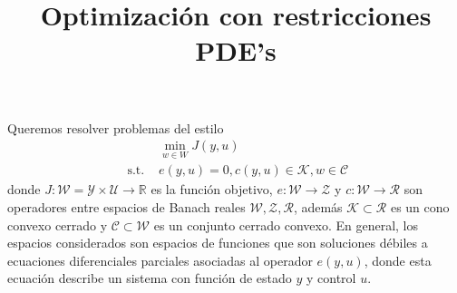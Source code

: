 \documentclass{article}
\title{Optimización con restricciones PDE's}
\begin{document}
\theoremstyle{definition}
\newtheorem{definition}{Definición}[section]
\newtheorem{theorem}{Teorema}
\newtheorem*{definition*}{Definición}
\newtheorem*{theorem*}{Teorema}

\maketitle

\noindent
Queremos resolver problemas del estilo 
\begin{equation}
\begin{split}
    &\min_{w\in W}J(y,u)\\
    \text{ s.t. } &e(y,u)=0, c(y,u)\in \mathcal{K},w\in\mathcal{C}
\end{split}
\end{equation}
donde $J:\mathcal{W}=\mathcal{Y}\times\mathcal{U}\to \mathbb{R}$ es la función objetivo, $e:\mathcal{W}\to \mathcal{Z}$ y $c:\mathcal{W}\to \mathcal{R}$ son operadores entre espacios de Banach reales $\mathcal{W},\mathcal{Z},\mathcal{R}$, además $\mathcal{K}\subset \mathcal{R}$ es un cono convexo cerrado y $\mathcal{C}\subset\mathcal{W}$ es un conjunto cerrado convexo.  En general, los espacios considerados son espacios de funciones que son soluciones débiles a ecuaciones diferenciales parciales asociadas al operador $e(y,u)$, donde esta ecuación describe un sistema con función de estado $y$ y control $u$.\\
\end{document}
